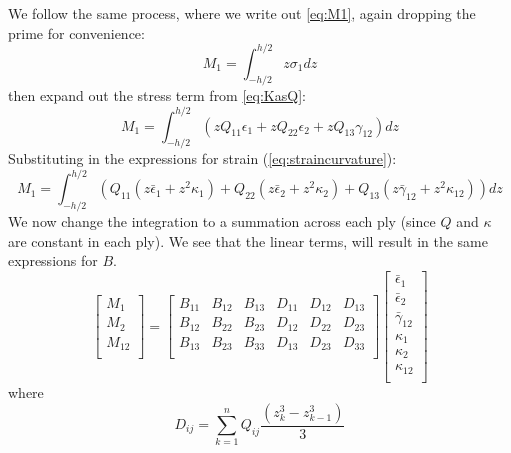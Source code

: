 \documentclass{article}
\begin{document}
We follow the same process, where we write out \cref{eq:M1}, again dropping the prime for convenience:
\begin{equation}
M_1 = \int_{-h/2}^{h/2} z \sigma_1 dz
\end{equation}
then expand out the stress term from \cref{eq:KasQ}:
\begin{equation}
M_1 = \int_{-h/2}^{h/2} (z Q_{11} \epsilon_1 + z Q_{22} \epsilon_2 + z Q_{13} \gamma_{12}) dz
\end{equation}
Substituting in the expressions for strain (\cref{eq:straincurvature}):
\begin{equation}
M_1 = \int_{-h/2}^{h/2} (Q_{11} (z \bar\epsilon_{1} + z^2 \kappa_1) + Q_{22} (z \bar\epsilon_{2} + z^2 \kappa_2) +  Q_{13} (z \bar\gamma_{12} + z^2 \kappa_{12})) dz
\end{equation}
We now change the integration to a summation across each ply (since $Q$ and $\kappa$ are constant in each ply).  We see that the linear terms, will result in the same expressions for $B$.
\begin{equation}
\left[
\begin{matrix}
M_{1}\\
M_{2}\\
M_{12}\\
\end{matrix}
\right]
=
\left[
\begin{matrix}
    B_{11} & B_{12} & B_{13} & D_{11} & D_{12} & D_{13} \\
    B_{12} & B_{22} & B_{23}  & D_{12} & D_{22} & D_{23} \\
    B_{13} & B_{23} & B_{33} & D_{13} & D_{23} & D_{33} \\
\end{matrix}
\right]
\left[
\begin{matrix}
\bar\epsilon_{1}\\
\bar\epsilon_{2}\\
\bar\gamma_{12}\\
\kappa_1 \\
\kappa_2 \\
\kappa_{12} \\
\end{matrix}
\right]
\end{equation}
where
\begin{equation}
D_{ij} = \sum_{k=1}^n Q_{ij} \frac{(z_k^3 - z_{k-1}^3)}{3}
\end{equation}
\end{document}
